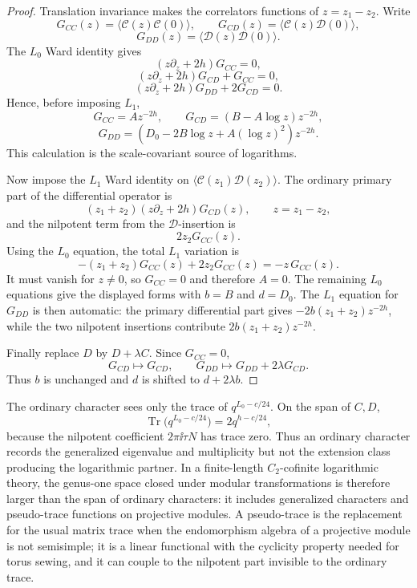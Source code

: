\begin{proof}
Translation invariance makes the correlators functions of
\(z=z_1-z_2\).  Write
\[
  G_{CC}(z)=\langle\mathcal C(z)\mathcal C(0)\rangle,\qquad
  G_{CD}(z)=\langle\mathcal C(z)\mathcal D(0)\rangle,
\]
\[
  G_{DD}(z)=\langle\mathcal D(z)\mathcal D(0)\rangle.
\]
The \(L_0\) Ward identity gives
\[
  (z\partial_z+2h)G_{CC}=0,
\]
\[
  (z\partial_z+2h)G_{CD}+G_{CC}=0,
\]
\[
  (z\partial_z+2h)G_{DD}+2G_{CD}=0.
\]
Hence, before imposing \(L_1\),
\[
  G_{CC}=A z^{-2h},\qquad
  G_{CD}=(B-A\log z)z^{-2h},
\]
\[
  G_{DD}=(D_0-2B\log z+A(\log z)^2)z^{-2h}.
\]
This calculation is the scale-covariant source of logarithms.

Now impose the \(L_1\) Ward identity on
\(\langle\mathcal C(z_1)\mathcal D(z_2)\rangle\).  The ordinary primary part
of the differential operator is
\[
  (z_1+z_2)(z\partial_z+2h)G_{CD}(z),
  \qquad z=z_1-z_2,
\]
and the nilpotent term from the \(\mathcal D\)-insertion is
\[
  2z_2G_{CC}(z).
\]
Using the \(L_0\) equation, the total \(L_1\) variation is
\[
  -(z_1+z_2)G_{CC}(z)+2z_2G_{CC}(z)
  =
  -z\,G_{CC}(z).
\]
It must vanish for \(z\ne0\), so \(G_{CC}=0\) and therefore \(A=0\).  The
remaining \(L_0\) equations give the displayed forms with \(b=B\) and
\(d=D_0\).  The \(L_1\) equation for \(G_{DD}\) is then automatic:
the primary differential part gives
\(-2b(z_1+z_2)z^{-2h}\), while the two nilpotent insertions contribute
\(2b(z_1+z_2)z^{-2h}\).

Finally replace \(D\) by \(D+\lambda C\).  Since \(G_{CC}=0\),
\[
  G_{CD}\mapsto G_{CD},\qquad
  G_{DD}\mapsto G_{DD}+2\lambda G_{CD}.
\]
Thus \(b\) is unchanged and \(d\) is shifted to \(d+2\lambda b\).
\end{proof}

The ordinary character sees only the trace of
\(q^{L_0-c/24}\).  On the span of \(C,D\),
\[
  \operatorname{Tr}\bigl(q^{L_0-c/24}\bigr)
  =
  2q^{h-c/24},
\]
because the nilpotent coefficient \(2\pi\ii\tau N\) has trace zero.  Thus an
ordinary character records the generalized eigenvalue and multiplicity but
not the extension class producing the logarithmic partner.  In a finite-length
\(C_2\)-cofinite logarithmic theory, the genus-one space closed under
modular transformations is therefore larger than the span of ordinary
characters: it includes generalized characters and pseudo-trace functions on
projective modules.  A pseudo-trace is the replacement for the usual matrix
trace when the endomorphism algebra of a projective module is not semisimple;
it is a linear functional with the cyclicity property needed for torus
sewing, and it can couple to the nilpotent part invisible to the ordinary
trace.

